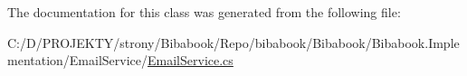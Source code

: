 The documentation for this class was generated from the following file\+:\begin{DoxyCompactItemize}
\item 
C\+:/\+D/\+P\+R\+O\+J\+E\+K\+T\+Y/strony/\+Bibabook/\+Repo/bibabook/\+Bibabook/\+Bibabook.\+Implementation/\+Email\+Service/\hyperlink{_email_service_8cs}{Email\+Service.\+cs}\end{DoxyCompactItemize}
